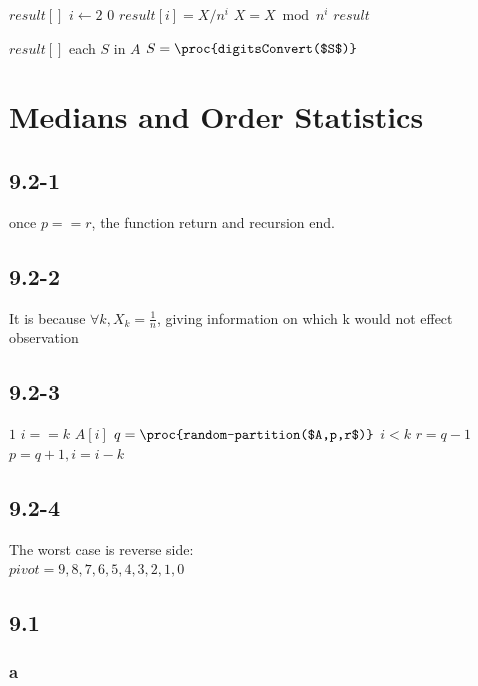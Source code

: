 \documentclass[]{article}
\begin{document}
\begin{codebox}
	\li $result []$
	\li \For $i \gets 2$ \Downto $0$
	\li		\Do $result[i] = X/n^i$
	\li			$X = X \bmod{n^i}$
	\End
	\li \Return $result$
\end{codebox}

\begin{codebox}
	\li $result []$
	\li \For each $S$ in $A$
	\li		\Do $S =\proc{digitsConvert($S$)}$
	\End
	\li {}
\end{codebox}

\section{Medians and Order Statistics}

\subsection{9.2-1}
once $p == r$, the function return and recursion end.

\subsection{9.2-2}
It is because $\forall k, X_{k} = \frac{1}{n}$, giving information on which k would not effect observation

\subsection{9.2-3}
\begin{codebox}
	\li \While $1$
	\li	\Do \If $i == k$
	\li  \Then \Return $A[i]$
	\li \Else 
	\li  $q =\proc{random-partition($A,p,r$)}$
	\li 	\If $i < k$
	\li     \Then $r = q-1$
	\li 	\Else $p = q+1, i = i-k$
	\End
	\End
	\End
\end{codebox}

\subsection{9.2-4}
The worst case is reverse side:\\
$pivot = {9,8,7,6,5,4,3,2,1,0}$

\subsection{9.1}
\subsubsection{a}
\end{document}
